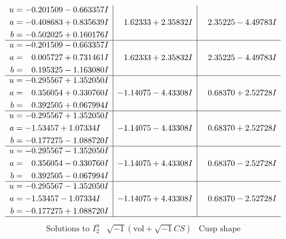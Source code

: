 \documentclass[1p]{elsarticle_modified}
\theoremstyle{definition}
\newcommand{\I}{\sqrt{-1}}
\begin{document}
$$\begin{array}{c|c|c}
\begin{aligned}
u &= -0.201509 - 0.663357 I \\
a &= -0.408683 + 0.835639 I \\
b &= -0.502025 + 0.160176 I\end{aligned}
 & \phantom{-}1.62333 + 2.35832 I & \phantom{-}2.35225 - 4.49783 I \\ \hline\begin{aligned}
u &= -0.201509 - 0.663357 I \\
a &= \phantom{-}0.005727 + 0.731461 I \\
b &= \phantom{-}0.195325 - 1.163080 I\end{aligned}
 & \phantom{-}1.62333 + 2.35832 I & \phantom{-}2.35225 - 4.49783 I \\ \hline\begin{aligned}
u &= -0.295567 + 1.352050 I \\
a &= \phantom{-}0.356054 + 0.330760 I \\
b &= \phantom{-}0.392505 + 0.067994 I\end{aligned}
 & -1.14075 - 4.43308 I & \phantom{-}0.68370 + 2.52728 I \\ \hline\begin{aligned}
u &= -0.295567 + 1.352050 I \\
a &= -1.53457 + 1.07334 I \\
b &= -0.177275 - 1.088720 I\end{aligned}
 & -1.14075 - 4.43308 I & \phantom{-}0.68370 + 2.52728 I \\ \hline\begin{aligned}
u &= -0.295567 - 1.352050 I \\
a &= \phantom{-}0.356054 - 0.330760 I \\
b &= \phantom{-}0.392505 - 0.067994 I\end{aligned}
 & -1.14075 + 4.43308 I & \phantom{-}0.68370 - 2.52728 I \\ \hline\begin{aligned}
u &= -0.295567 - 1.352050 I \\
a &= -1.53457 - 1.07334 I \\
b &= -0.177275 + 1.088720 I\end{aligned}
 & -1.14075 + 4.43308 I & \phantom{-}0.68370 - 2.52728 I\\
 \hline 
 \end{array}$$\newpage$$\begin{array}{c|c|c}  
\text{Solutions to }I^u_{2}& \I (\text{vol} + \sqrt{-1}CS) & \text{Cusp shape}\\
 \hline 
\begin{aligned}

\end{aligned}
\end{array}$$
\end{document}
